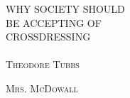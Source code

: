 \newcommand*{\titleGP}{\begingroup %
\centering %
\vspace*{\baselineskip} %


{\LARGE WHY SOCIETY SHOULD\\ BE ACCEPTING OF \\[0.3\baselineskip] CROSSDRESSING}\\~\\[0.2\baselineskip] %


\scshape %
Theodore Tubbs
\vspace*{2\baselineskip} %


\vfill %

\scshape Mrs. McDowall\\[0.3\baselineskip] %

\endgroup}


\thispagestyle{empty} %

\titleGP %
